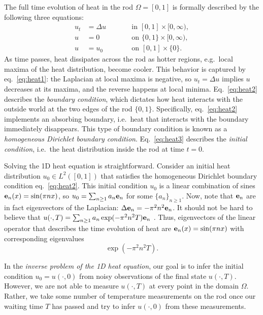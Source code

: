 The full time evolution of heat in the rod $\Omega=[0,1]$ is formally
described by the following three equations:
\begin{subequations}
  \begin{alignat}{2}
    u_t &= \Delta u &&\qquad \text{in } [0,1] \times [0,\infty), \label{eq:heat1}\\
    u &= 0 &&\qquad \text{on } \{0, 1\} \times [0,\infty), \label{eq:heat2}\\
    u &= u_0 &&\qquad \text{on }[0,1] \times \{0\}. \label{eq:heat3}
  \end{alignat}
\end{subequations}
As time passes, heat dissipates across the rod as hotter regions,
e.g.~local maxima of the heat distribution, become cooler. This
behavior is captured by eq.~\eqref{eq:heat1}: the Laplacian at local
maxima is negative, so $u_t = \Delta u$ implies $u$ decreases at its
maxima, and the reverse happens at local minima. Eq.~\eqref{eq:heat2}
describes the \emph{boundary condition}, which dictates how heat
interacts with the outside world at the two edges of the rod
$\{0,1\}$. Specifically, eq.~\eqref{eq:heat2} implements an absorbing
boundary, i.e.~heat that interacts with the boundary immediately
disappears. This type of boundary condition is known as a
\emph{homogeneous Dirichlet boundary condition}. Eq.~\eqref{eq:heat3}
describes the \emph{initial condition}, i.e.~the heat distribution
inside the rod at time $t=0$.

Solving the 1D heat equation is straightforward. Consider an initial
heat distribution $u_0\in L^2([0,1])$ that satisfies the homogeneous
Dirichlet boundary condition eq.~\eqref{eq:heat2}. This initial
condition $u_0$ is a linear combination of sines $\mathbf{e}_n(x) = \sin(\pi
n x)$, so $u_0 = \sum_{n\geq 1} a_n \mathbf{e}_n$ for some $\{a_n\}_{n\geq
  1}$. Now, note that $\mathbf{e}_n$ are in fact eigenvectors of the
Laplacian: $\Delta \mathbf{e}_n = -\pi^2 n^2\mathbf{e}_n$. It should not be hard to
believe that $u(\cdot, T) = \sum_{n\geq 1} a_n \exp(-\pi^2 n^2T )
\mathbf{e}_n$ \citet{renardy2006PDE}. Thus, eigenvectors of the linear
operator that describes the time evolution of heat are $\mathbf{e}_n(x) =
\sin(\pi n x)$ with corresponding eigenvalues
\begin{equation}\label{eq:decay}
  \exp(-\pi^2 n^2T ).
\end{equation}

In the \emph{inverse problem of the 1D heat equation}, our goal is to
infer the initial condition $u_0 = u(\cdot, 0)$ from noisy
observations of the final state $u(\cdot, T)$. However, we are not
able to measure $u(\cdot, T)$ at every point in the domain
$\Omega$. Rather, we take some number of temperature measurements on
the rod once our waiting time $T$ has passed and try to infer
$u(\cdot, 0)$ from these measurements.

